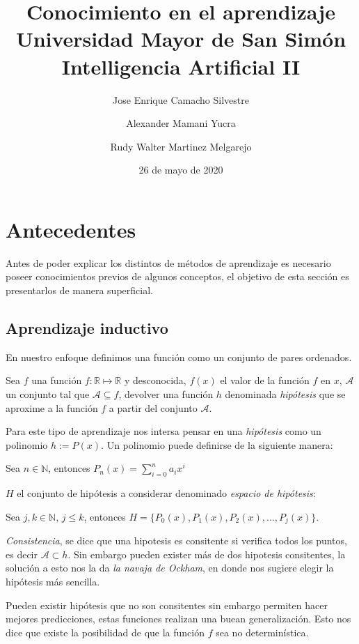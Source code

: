 \documentclass[12 pt, a4paper]{article}
\title{
	{Conocimiento en el aprendizaje}\\
	{\large Universidad Mayor de San Simón}\\
	{\large Intelligencia Artificial II}
}
\author{{Jose Enrique Camacho Silvestre}\and {Alexander Mamani Yucra}\and {Rudy Walter Martinez Melgarejo}}
\date{26 de mayo de 2020}
\begin{document}
	\maketitle
	\section{Antecedentes}
	Antes de poder explicar los distintos de métodos de aprendizaje es necesario poseer conocimientos previos de algunos conceptos, el objetivo de esta sección es presentarlos de manera superficial.
		\subsection{Aprendizaje inductivo}
			En nuestro enfoque definimos una función como un conjunto de pares ordenados.
			
			Sea \(f\) una función \(f: \mathbb{R} \mapsto \mathbb{R} \) y desconocida, \(f(x)\) el valor de la función \(f\) en \(x\), \(\mathcal{A}\) un conjunto tal que \(\mathcal{A} \subseteq f\),  devolver una función \(h\) denominada \emph{hipótesis} que se aproxime a la función \(f\) a partir del conjunto \(\mathcal{A}\). 
			
			Para este tipo de aprendizaje nos intersa pensar en una \emph{hipótesis} como un polinomio \(h := P(x)\). Un polinomio puede definirse de la siguiente manera:
			
			\begin{center}
				Sea \( n \in \mathbb{N}\), entonces \(P_{n}(x) =  \sum_{i = 0}^{n} a_{i}x^{i}\)
			\end{center}				
			\(H\) el conjunto de hipótesis a considerar denominado \emph{espacio de hipótesis}: 

			\begin{center}
				Sea \(j, k \in \mathbb{N}\),  \(j\leq k\), entonces \(H = \{ P_{0}(x), P_{1}(x), P_{2}(x), ... , P_{j}(x) \}\). 
			\end{center}
			
			\emph{Consistencia}, se dice que una hipotesis es consitente si verifica todos los puntos, es decir \(\mathcal{A} \subset h\). Sin embargo pueden exister más de dos hipotesis consitentes, la solución a esto nos la da \emph{la navaja de Ockham}, en donde nos sugiere elegir la hipótesis más sencilla.
			
			Pueden existir hipótesis que no son consitentes sin embargo permiten hacer mejores predicciones, estas funciones realizan una buean generalización. Esto nos dice que existe la posibilidad de que la función \(f\) sea no determinística.
			
\end{document}
